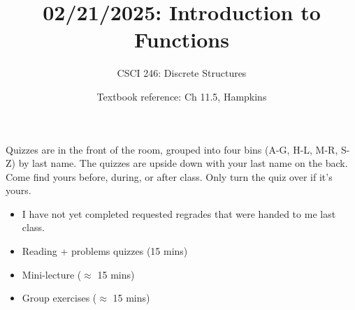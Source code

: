 \documentclass[10pt]{beamer}
\begin{document}






\title{02/21/2025: Introduction to Functions}
\author{CSCI 246: Discrete Structures}
\date{Textbook reference: Ch 11.5, Hampkins}

\begin{frame}
    \titlepage 
\end{frame}


\begin{frame}
\footnotesize 
\begin{mygreenbox}[title=Graded Quiz Pickup]
Quizzes are in the front of the room, grouped into four bins (A-G, H-L, M-R, S-Z) by last name. The quizzes are upside down with your last name on the back. Come find yours before, during, or after class.  Only turn the quiz over if it's yours.
\end{mygreenbox} 
\vfill 

\begin{myredbox}[title=Announcements]

\begin{itemize}
\item I have not yet completed requested regrades that were handed to me last class. 
\end{itemize}

\end{myredbox}

\vfill 


\begin{myyellowbox}[title=Today's Agenda]
\begin{itemize}
	\item Reading + problems quizzes (15 mins)
	\item Mini-lecture ($\approx$ 15 mins)
	\item Group exercises ($\approx$ 15 mins)
\end{itemize}

\end{myyellowbox}
\vfill 

\end{frame}
\end{document}
